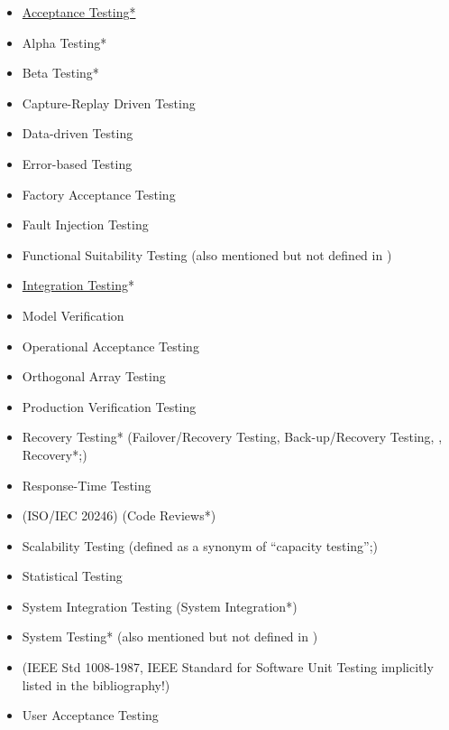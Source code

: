       \begin{itemize}
            \item \underline{Acceptance Testing*}
            \item Alpha Testing*
            \item Beta Testing*
            \item Capture-Replay Driven Testing
            \item Data-driven Testing
            \item Error-based Testing
            \item Factory Acceptance Testing
            \item Fault Injection Testing
            \item Functional Suitability Testing (also mentioned but not defined in
                  \citep{IEEE2017})
            \item \underline{Integration Testing}*
            \item Model Verification
            \item Operational Acceptance Testing
            \item Orthogonal Array Testing
            \item Production Verification Testing
            \item Recovery Testing* (Failover/Recovery Testing, Back-up/Recovery
                  Testing, ,
                  Recovery*;)
            \item Response-Time Testing
            \item {} (ISO/IEC 20246) (Code Reviews*)
            \item Scalability Testing (defined as a synonym of ``capacity
                  testing'';)
            \item Statistical Testing
            \item System Integration Testing (System Integration*)
            \item System Testing* (also mentioned but not defined in \citep{IEEE2013})
            \item {}
                  (IEEE Std 1008-1987, IEEE Standard for
                  Software Unit Testing implicitly listed in the bibliography!)
            \item User Acceptance Testing
      \end{itemize}
\fi

